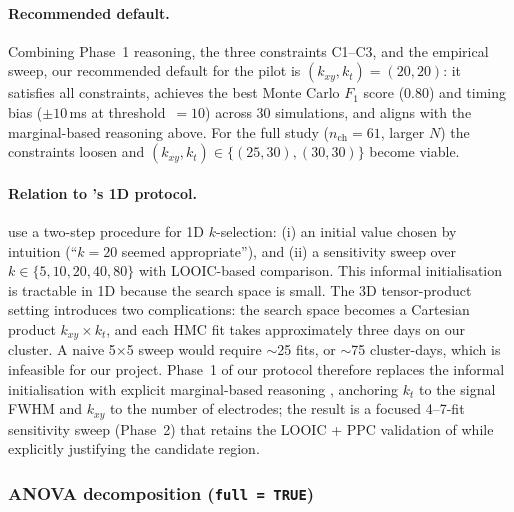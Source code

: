 \documentclass[12pt, a4paper]{article}
\begin{document}
\paragraph{Recommended default.}
Combining Phase~1 reasoning, the three constraints C1--C3, and the
empirical sweep, our recommended default for the pilot is
$(k_{xy}, k_t) = (20, 20)$: it satisfies all constraints, achieves
the best Monte Carlo $F_1$ score (0.80) and timing bias
($\pm 10$\,ms at threshold~$=10$) across 30 simulations, and aligns
with the marginal-based reasoning above. For the full study
($n_{\mathrm{ch}} = 61$, larger $N$) the constraints loosen and
$(k_{xy}, k_t) \in \{(25, 30), (30, 30)\}$ become viable.

\paragraph{Relation to \citet{Nalborczyk2025}'s 1D protocol.}
\citet[Appendix~B]{Nalborczyk2025} use a two-step procedure for 1D
$k$-selection: (i) an initial value chosen by intuition (``$k=20$
seemed appropriate''), and (ii) a sensitivity sweep over
$k \in \{5, 10, 20, 40, 80\}$ with LOOIC-based comparison. This
informal initialisation is tractable in 1D because the search space
is small. The 3D tensor-product setting introduces two complications:
the search space becomes a Cartesian product $k_{xy} \times k_t$,
and each HMC fit takes approximately three days on our cluster. A
naive 5$\times$5 sweep would require $\sim$25 fits, or $\sim$75
cluster-days, which is infeasible for our project. Phase~1 of our
protocol therefore replaces the informal initialisation with explicit
marginal-based reasoning \citep[\S 4]{Pedersen2019}, anchoring $k_t$
to the signal FWHM and $k_{xy}$ to the number of electrodes; the
result is a focused 4--7-fit sensitivity sweep (Phase~2) that retains
the LOOIC + PPC validation of \citet{Nalborczyk2025} while explicitly
justifying the candidate region.

\subsubsection{ANOVA decomposition (\texttt{full = TRUE})}\label{sec:theory_full}
\end{document}
